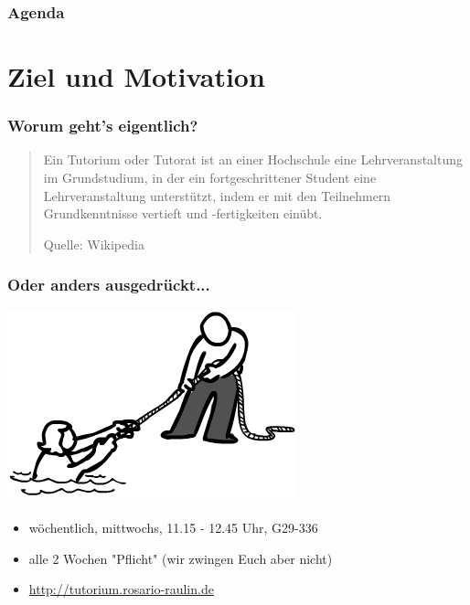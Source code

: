 \documentclass[12pt]{beamer}
\begin{document}
\begin{frame}
	\frametitle{Agenda}
	\tableofcontents
\end{frame}


\section{Ziel und Motivation}

\begin{frame}

\frametitle{Worum geht's eigentlich?}

	\begin{quote}
		Ein Tutorium oder Tutorat ist an einer Hochschule eine Lehrveranstaltung
		im Grundstudium, in der ein fortgeschrittener Student eine
		Lehrveranstaltung unterstützt, indem er mit den Teilnehmern
		Grundkenntnisse vertieft und -fertigkeiten einübt.

		\begin{flushright}
			\scriptsize Quelle: Wikipedia
		\end{flushright}

	\end{quote}
	
\end{frame}

\begin{frame}

	\frametitle{Oder anders ausgedrückt...}

	\pause
	\begin{center}
		\includegraphics[scale=0.42]{src/img/help}
	\end{center}
	\pause

	\begin{itemize}
		\item wöchentlich, mittwochs, 11.15 - 12.45 Uhr, G29-336
		\item alle 2 Wochen "Pflicht" (wir zwingen Euch aber nicht)
		\item \url{http://tutorium.rosario-raulin.de}
	\end{itemize}

\end{frame}
\end{document}
